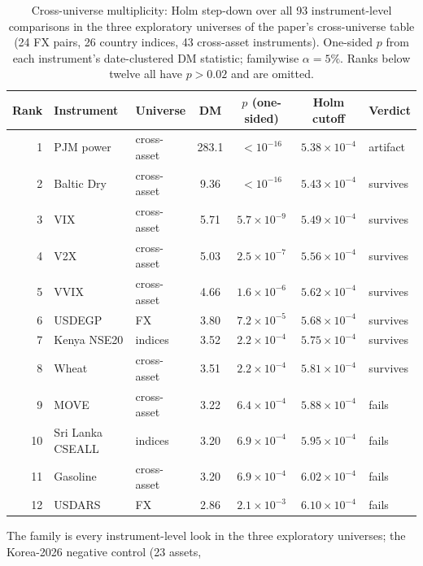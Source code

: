 \documentclass[11pt]{article}
\begin{document}
\begin{table}[htbp]
\centering
\begin{threeparttable}
\caption{Cross-universe multiplicity: Holm step-down over all 93
instrument-level comparisons in the three exploratory universes of the
paper's cross-universe table (24 FX pairs, 26 country indices, 43
cross-asset instruments). One-sided $p$ from each instrument's date-clustered DM
statistic; familywise $\alpha=5\%$. Ranks below twelve all have
$p>0.02$ and are omitted.}
\label{tab:holm}
\footnotesize\setlength{\tabcolsep}{5pt}
\begin{tabular}{rllcccl}
\toprule
Rank & Instrument & Universe & DM & $p$ (one-sided) & Holm cutoff & Verdict \\
\midrule
1 & PJM power\tnote{a} & cross-asset & 283.1 & $<10^{-16}$ & $5.38\times10^{-4}$ & artifact\tnote{a} \\
2 & Baltic Dry & cross-asset & 9.36 & $<10^{-16}$ & $5.43\times10^{-4}$ & survives \\
3 & VIX & cross-asset & 5.71 & $5.7\times10^{-9}$ & $5.49\times10^{-4}$ & survives \\
4 & V2X & cross-asset & 5.03 & $2.5\times10^{-7}$ & $5.56\times10^{-4}$ & survives \\
5 & VVIX & cross-asset & 4.66 & $1.6\times10^{-6}$ & $5.62\times10^{-4}$ & survives \\
6 & USDEGP & FX & 3.80 & $7.2\times10^{-5}$ & $5.68\times10^{-4}$ & survives \\
7 & Kenya NSE20 & indices & 3.52 & $2.2\times10^{-4}$ & $5.75\times10^{-4}$ & survives \\
8 & Wheat & cross-asset & 3.51 & $2.2\times10^{-4}$ & $5.81\times10^{-4}$ & survives \\
9 & MOVE & cross-asset & 3.22 & $6.4\times10^{-4}$ & $5.88\times10^{-4}$ & fails \\
10 & Sri Lanka CSEALL & indices & 3.20 & $6.9\times10^{-4}$ & $5.95\times10^{-4}$ & fails \\
11 & Gasoline & cross-asset & 3.20 & $6.9\times10^{-4}$ & $6.02\times10^{-4}$ & fails \\
12 & USDARS & FX & 2.86 & $2.1\times10^{-3}$ & $6.10\times10^{-4}$ & fails \\
\bottomrule
\end{tabular}
\begin{tablenotes}\footnotesize
\item The family is every instrument-level look in the three
exploratory universes; the Korea-2026 negative control (23 assets,

\end{tablenotes}
\end{threeparttable}
\end{table}
\end{document}
